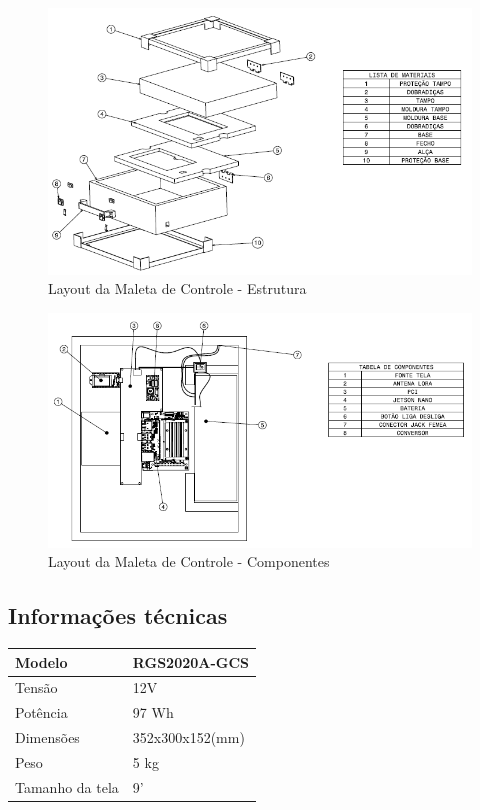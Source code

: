 \begin{figure}[H]
  \centering
  \includegraphics[scale=0.7]{Figuras/gcs_explode.png}
  \caption{Layout da Maleta de Controle - Estrutura}
  \label{fig:gcs_explode}
\end{figure}

\begin{figure}[H]
  \centering
  \includegraphics[scale=0.7]{Figuras/gcs_componentes.png}
  \caption{Layout da Maleta de Controle - Componentes}
  \label{fig:gcs_explode}
\end{figure}

\subsection*{Informações técnicas}

\begin{table}[H]
\centering
\begin{tabular}{|l|l|}
\hline
Modelo & RGS2020A-GCS \\ \hline
Tensão & 12V \\ \hline
Potência & 97 Wh \\ \hline
Dimensões & 352x300x152(mm) \\ \hline
Peso & 5 kg \\ \hline
Tamanho da tela & 9' \\ \hline
\end{tabular}
\end{table}

